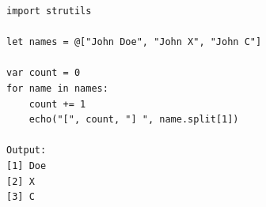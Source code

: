 \documentclass[10pt, a4paper, twocolumn]{article} %
\begin{document}
\begin{lstlisting}
import strutils

let names = @["John Doe", "John X", "John C"]

var count = 0
for name in names:
    count += 1
    echo("[", count, "] ", name.split[1])

Output:
[1] Doe
[2] X
[3] C
\end{lstlisting}

\printbibliography[title={Bibliography}] %

\end{document}
